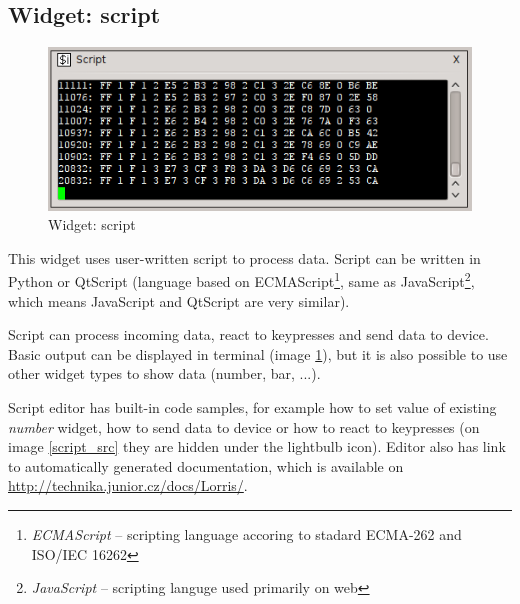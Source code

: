 \documentclass[12pt, a4paper, oneside]{article}
\newcommand{\It}{\textit}  %
\begin{document}
\subsection{Widget: script}
\begin{figure}[h]
\begin{center}
\includegraphics[scale=0.8]{img/w_script.png}
\caption{Widget: script}
\label{script_w}
\end{center}
\end{figure}
This widget uses user-written script to process data. Script can be written in Python or QtScript\cite{qtscript} (language based on ECMAScript\footnote{\It{ECMAScript} -- scripting language accoring to stadard ECMA-262 and ISO/IEC 16262}, same as JavaScript\footnote{\It{JavaScript} -- scripting languge used primarily on web}, which means JavaScript and QtScript are very similar).

Script can process incoming data, react to keypresses and send data to device. Basic output can be displayed in terminal (image \ref{script_w}), but it is also possible to use other widget types to show data (number, bar, ...).

Script editor has built-in code samples, for example how to set value of existing \It{number} widget, how to send data to device or how to react to keypresses (on image \ref{script_src} they are hidden under the lightbulb icon). Editor also has link to automatically generated documentation, which is available on \url{http://technika.junior.cz/docs/Lorris/}.
\end{document}
